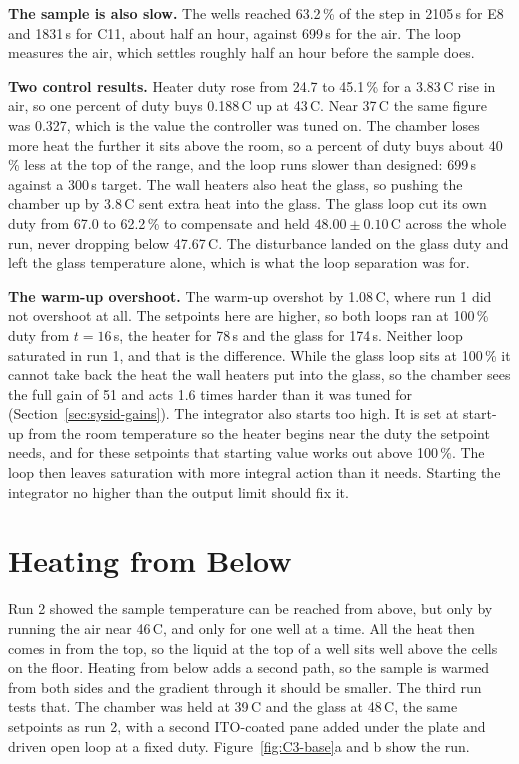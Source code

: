 \textbf{The sample is also slow.} The wells reached 63.2\,\% of the step in 2105\,s for E8 and 1831\,s for C11, about half an hour, against 699\,s for the air. The loop measures the air, which settles roughly half an hour before the sample does.

\textbf{Two control results.} Heater duty rose from 24.7 to 45.1\,\% for a 3.83\,\textdegree{}C rise in air, so one percent of duty buys 0.188\,\textdegree{}C up at 43\,\textdegree{}C. Near 37\,\textdegree{}C the same figure was 0.327, which is the value the controller was tuned on. The chamber loses more heat the further it sits above the room, so a percent of duty buys about 40\,\% less at the top of the range, and the loop runs slower than designed: 699\,s against a 300\,s target. The wall heaters also heat the glass, so pushing the chamber up by 3.8\,\textdegree{}C sent extra heat into the glass. The glass loop cut its own duty from 67.0 to 62.2\,\% to compensate and held $48.00 \pm 0.10$\,\textdegree{}C across the whole run, never dropping below 47.67\,\textdegree{}C. The disturbance landed on the glass duty and left the glass temperature alone, which is what the loop separation was for.

\textbf{The warm-up overshoot.} The warm-up overshot by 1.08\,\textdegree{}C, where run 1 did not overshoot at all. The setpoints here are higher, so both loops ran at 100\,\% duty from $t = 16$\,s, the heater for 78\,s and the glass for 174\,s. Neither loop saturated in run 1, and that is the difference. While the glass loop sits at 100\,\% it cannot take back the heat the wall heaters put into the glass, so the chamber sees the full gain of 51 and acts 1.6 times harder than it was tuned for (Section~\ref{sec:sysid-gains}). The integrator also starts too high. It is set at start-up from the room temperature so the heater begins near the duty the setpoint needs, and for these setpoints that starting value works out above 100\,\%. The loop then leaves saturation with more integral action than it needs. Starting the integrator no higher than the output limit should fix it.

\section{Heating from Below}
\label{sec:cl-test3}

Run 2 showed the sample temperature can be reached from above, but only by running the air near 46\,\textdegree{}C, and only for one well at a time. All the heat then comes in from the top, so the liquid at the top of a well sits well above the cells on the floor. Heating from below adds a second path, so the sample is warmed from both sides and the gradient through it should be smaller. The third run tests that. The chamber was held at 39\,\textdegree{}C and the glass at 48\,\textdegree{}C, the same setpoints as run 2, with a second ITO-coated pane added under the plate and driven open loop at a fixed duty. Figure~\ref{fig:C3-base}a and b show the run.

